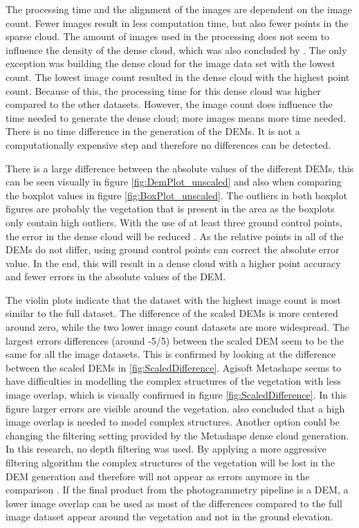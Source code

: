 \documentclass{isprs} %
\begin{document}
The processing time and the alignment of the images are dependent on the image count.
Fewer images result in less computation time, but also fewer points in the sparse cloud.
The amount of images used in the processing does not seem to influence the density of the dense cloud, which was also concluded by \citet{EffectofUABimgcamover}. 
The only exception was building the dense cloud for the image data set with the lowest count. 
The lowest image count resulted in the dense cloud with the highest point count.
Because of this, the processing time for this dense cloud was higher compared to the other datasets.
However, the image count does influence the time needed to generate the dense cloud; more images means more time needed.
There is no time difference in the generation of the DEMs.
It is not a computationally expensive step and therefore no differences can be detected.

There is a large difference between the absolute values of the different DEMs, this can be seen visually in figure \ref{fig:DemPlot_unscaled} and also when comparing the boxplot values in figure \ref{fig:BoxPlot_unscaled}.
The outliers in both boxplot figures are probably the vegetation that is present in the area as the boxplots only contain high outliers.
With the use of at least three ground control points, the error in the dense cloud will be reduced \citep{AssessingUAVGCPS, GCPbetterAccuracy, GeoreferencedPointClouds}.
As the relative points in all of the DEMs do not differ, using ground control points can correct the absolute error value.
In the end, this will result in a dense cloud with a higher point accuracy and fewer errors in the absolute values of the DEM.

The violin plots indicate that the dataset with the highest image count is most similar to the full dataset. 
The difference of the scaled DEMs is more centered around zero, while the two lower image count datasets are more widespread.
The largest errors differences (around -5/5) between the scaled DEM seem to be the same for all the image datasets.
This is confirmed by looking at the difference between the scaled DEMs in \ref{fig:ScaledDifference}.
Agisoft Metashape seems to have difficulties in modelling the complex structures of the vegetation with less image overlap, which is visually confirmed in figure \ref{fig:ScaledDifference}. 
In this figure larger errors are visible around the vegetation.
\citet{AccessingImageOverlap} also concluded that a high image overlap is needed to model complex structures.
Another option could be changing the filtering setting provided by the Metashape dense cloud generation.
In this research, no depth filtering was used.
By applying a more aggressive filtering algorithm the complex structures of the vegetation will be lost in the DEM generation and therefore will not appear as errors anymore in the comparison \citep{AgisoftMetashape}.
If the final product from the photogrammetry pipeline is a DEM, a lower image overlap can be used as most of the differences compared to the full image dataset appear around the vegetation and not in the ground elevation.
\end{document}

